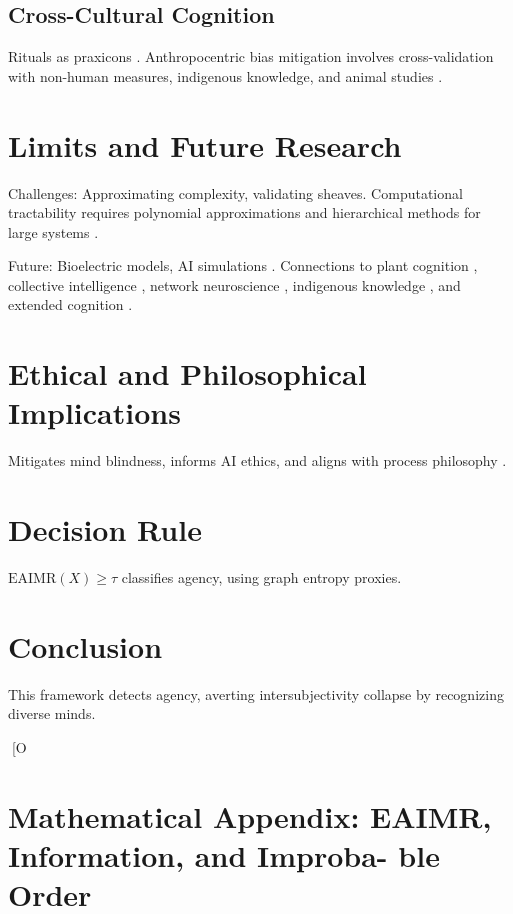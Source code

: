 \documentclass{article}
\begin{document}
\subsection{Cross-Cultural Cognition}
Rituals as praxicons \citep{ortega1961meditations}. Anthropocentric bias mitigation involves cross-validation with non-human measures, indigenous knowledge, and animal studies \citep{kimmerer2013braiding}.

\section{Limits and Future Research}
\label{sec:limits}

Challenges: Approximating complexity, validating sheaves. Computational tractability requires polynomial approximations and hierarchical methods for large systems \citep{kolmogorov1965three}.

Future: Bioelectric models, AI simulations \citep{levin2019computational}. Connections to plant cognition \citep{calvo2020plants}, collective intelligence \citep{camazine2001self}, network neuroscience \citep{bassett2017network}, indigenous knowledge \citep{kimmerer2013braiding}, and extended cognition \citep{clark2010supersizing}.

\section{Ethical and Philosophical Implications}
\label{sec:ethics}

Mitigates mind blindness, informs AI ethics, and aligns with process philosophy \citep{dennett1987intentional, whitehead1929process, deleuze1987thousand}.

\section{Decision Rule}
\label{sec:decision}

\(\text{EAIMR}(X) \geq \tau\) classifies agency, using graph entropy proxies.

\section{Conclusion}
\label{sec:conclusion}

This framework detects agency, averting intersubjectivity collapse by recognizing diverse minds.

\appendix
[O
\section{Mathematical Appendix: EAIMR, Information, and Improba-
ble Order}
\end{document}
